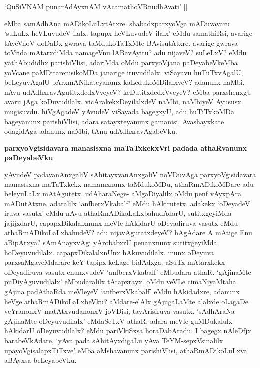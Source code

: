 \begin{shloka}
`QuSiVNAM punarAdAyxnAM vAcamathoVRnudhAvati' ||\label{216}
\end{shloka}

\noindent
eMba samAdhAna mADikoLuLxtAtxre. shabadxparxyoVga mADuvavaru `suLuLx heVLuvudeV ilalx. tapupx heVLuvudeV ilalx' eMdu samathiRsi, avarige tAveVnoV doDaDx gwrava taMdukoTaTxMte BAvisutAtxre. avarige gwrava toVrida mAtarxdiMda namageVnu lABavAyitu? adu nijaveV? suLeLxV? eMdu yathA\-budidhx parishiVlisi, adariMda oMdu parxyoVjana paDeyabeVkeMba yoVcane paMDitarenisikoMDa jana\-rige iruvudilalx. viSayavu huTuTxvAgalU, beLeyuvAgalU pArxmANikateyanunx kaLedukoMDilalxveV? adanunx naMbi, nAvu udAdhxravAgutitxdedxVveyeV? keDutitxdedxVveyeV? eMba parxshenxgU avaru jAga koDuvudilalx. vicArakekxDeyilalxdeV naMbi, naMbiyeV Ayususx mugisuvdu. hiVgAgadeV yAvudeV viSayada bagegxyU, adu huTiTxkoMDa bageyanunx parishiVlisi, adara satayxteyanunx gamanisi, Avashayxkate odagidAga adanunx naMbi, tAnu udAdhxravAgabeVku.

{\bigskip
\noindent
{\large\bf parxyoVgisidavara manasisxna maTaTxkekxVri padada athaRvanunx paDeyabeVku}}\label{page216}
\medskip

\noindent
yAvudeV padavanAnxgaliV sAhitayxvanAnxgaliV noVDuvAga parxyoVgisidavara manasisxna maTaTxkekx namamx\-nunx taMdukoMDu, athaRmADikoMDare adu beleyuLaLx mAtAgutetx. udAharaNege- aMgaDi\-yalilx oMdu penf vAyxpAra mADutAtxne. adaralilx `anfberxVkabalf' eMdu hAkirutetx. adakekx `oDeyadeV iruva vasutx' eMdu nAvu athaRmADikoLaLxbahudAdarU, sutitxgeyiMda jajijxdarU, capapxDikalalxnunx meVle hAki\-darU oDeyadiruva vasutx eMdu athaRmADikoLaLxbahudeV? adu nijavAgutatxdeyeV? hAgAdare A mAtige Enu aBipArxya? sAmAnayxvAgi yArobabxrU penanxnunx sutitxgeyiMda hoDeyuvu\-dilalx. capapx\-DikalalxnUnx hAkuvudilalx. inunx oDeyuva parxsaMgaveMdarare keY tapipx keLage bidAdxga. aSuTx mAtarxkekx oDeyadiruva vasutx enunxvudeV `anfberxVkabalf' eMbudara athaR. `gAjinaMte puDiyAguvudilalx' eMbu\-daralilx tAtapxrayx. oMdu veVLe cimaNiyaMtaha gAjina padAthaRda meVleyeV `anfberxVkabalf' eMdu hAkidadxre, adanunx heVge athaRmADikoLaLxbeVku? aMdare-elAlx gAjugaLaMte alalxde oLa\-gaDe veYranonxV matAtxvudanonxV joVDisi, tayArisiruva vasutx, `sAdhAraNa gAjinaMte oDeyuvudilalx' eMda\-SeTxV athaR. adara meVle guMDukalulx hAkidarU oDeyuvudilalx? eMdu pariVkiSxsa horaDabAradu. I bagegx nAleDfjx barabeVkAdare, `yAva pada sAhitAyxdigaLu yAva TeYM-sepxVsinalilx upayoVgisalapxTiTxve' eMba aMshavanunx parishiVlisi, athaRmADikoLuLxva aBAyxsa beLeyabeVku.

